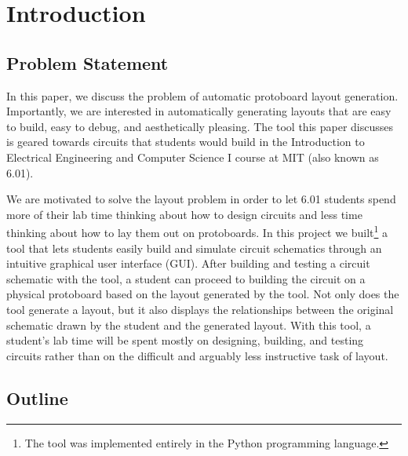 

\chapter{Introduction}
\label{ch:intro}

\section{Problem Statement}

In this paper, we discuss the problem of automatic protoboard layout generation.
Importantly, we are interested in automatically generating layouts that are
easy to build, easy to debug, and aesthetically pleasing. The tool this
paper discusses
is geared towards circuits that students would build in the
Introduction to Electrical Engineering and Computer Science I\cite{sixohone} 
course at MIT (also known as 6.01).

We are motivated to solve the layout
problem in order to let 6.01 students spend more of their lab time thinking
about how to design
circuits and less time thinking about how to lay them out on protoboards.
In this project we built\footnote{The tool was implemented entirely in the
Python programming language.}
a tool that lets students easily build and
simulate circuit schematics through an intuitive graphical user interface (GUI).
After building and testing a circuit schematic with the tool, a student can
proceed to building the circuit on a physical protoboard based on the layout
generated by the tool. Not only does the tool generate a layout, but it
also displays the relationships between the original schematic drawn by the
student and the generated layout.
With this tool, a student's lab time will be spent mostly
on designing, building, and testing circuits rather than on the difficult and
arguably less instructive task of layout.

\section{Outline}

